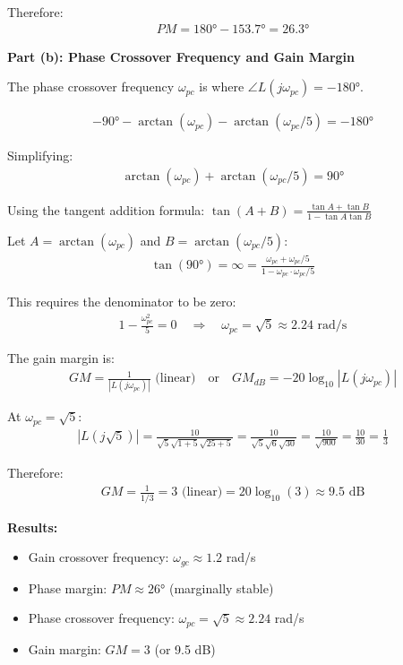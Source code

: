 \documentclass[11pt,a4paper]{article}
\begin{document}
Therefore:
\begin{align}
PM = 180° - 153.7° = 26.3°
\end{align}

\textbf{Part (b): Phase Crossover Frequency and Gain Margin}

The phase crossover frequency $\omega_{pc}$ is where $\angle L(j\omega_{pc}) = -180°$.

\begin{align}
-90° - \arctan(\omega_{pc}) - \arctan(\omega_{pc}/5) = -180°
\end{align}

Simplifying:
\begin{align}
\arctan(\omega_{pc}) + \arctan(\omega_{pc}/5) = 90°
\end{align}

Using the tangent addition formula: $\tan(A + B) = \frac{\tan A + \tan B}{1 - \tan A \tan B}$

Let $A = \arctan(\omega_{pc})$ and $B = \arctan(\omega_{pc}/5)$:
\begin{align}
\tan(90°) = \infty = \frac{\omega_{pc} + \omega_{pc}/5}{1 - \omega_{pc} \cdot \omega_{pc}/5}
\end{align}

This requires the denominator to be zero:
\begin{align}
1 - \frac{\omega_{pc}^2}{5} = 0 \quad \Rightarrow \quad \omega_{pc} = \sqrt{5} \approx 2.24 \text{ rad/s}
\end{align}

The gain margin is:
\begin{align}
GM = \frac{1}{|L(j\omega_{pc})|} \text{ (linear)} \quad \text{or} \quad GM_{dB} = -20\log_{10}|L(j\omega_{pc})|
\end{align}

At $\omega_{pc} = \sqrt{5}$:
\begin{align}
|L(j\sqrt{5})| = \frac{10}{\sqrt{5}\sqrt{1+5}\sqrt{25+5}} = \frac{10}{\sqrt{5}\sqrt{6}\sqrt{30}} = \frac{10}{\sqrt{900}} = \frac{10}{30} = \frac{1}{3}
\end{align}

Therefore:
\begin{align}
GM = \frac{1}{1/3} = 3 \text{ (linear)} = 20\log_{10}(3) \approx 9.5 \text{ dB}
\end{align}

\textbf{Results:}
\begin{itemize}
\item Gain crossover frequency: $\omega_{gc} \approx 1.2$ rad/s
\item Phase margin: $PM \approx 26°$ (marginally stable)
\item Phase crossover frequency: $\omega_{pc} = \sqrt{5} \approx 2.24$ rad/s
\item Gain margin: $GM = 3$ (or 9.5 dB)
\end{itemize}
\end{document}
